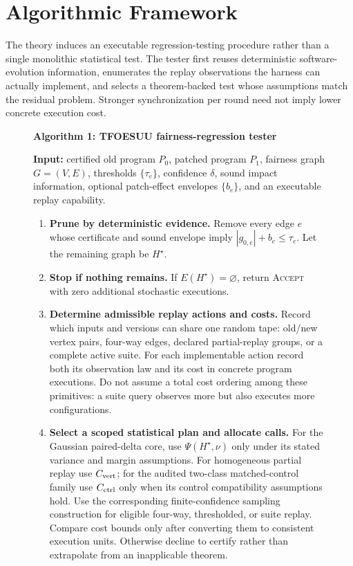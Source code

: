 \section{Algorithmic Framework}
\label{sec:algorithm}

The theory induces an executable regression-testing procedure rather than a
single monolithic statistical test. The tester first reuses deterministic
software-evolution information, enumerates the replay observations the harness
can actually implement, and selects a theorem-backed test whose assumptions
match the residual problem. Stronger synchronization per round need not imply
lower concrete execution cost.

\begin{figure}[t]
\centering
\setlength{\fboxsep}{8pt}
\colorbox{black!5}{\begin{minipage}{0.93\textwidth}
\textbf{Algorithm 1: TFOESUU fairness-regression tester}

\smallskip
\textbf{Input:} certified old program $P_0$, patched program $P_1$, fairness
graph $G=(V,E)$, thresholds $\{\tau_e\}$, confidence $\delta$, sound impact
information, optional patch-effect envelopes $\{b_e\}$, and an executable
replay capability.

\begin{enumerate}[leftmargin=1.6em,itemsep=2pt,topsep=3pt]
\item \textbf{Prune by deterministic evidence.}
Remove every edge $e$ whose certificate and sound envelope imply
$|g_{0,e}|+b_e\le \tau_e$.  Let the remaining graph be $H^\star$.

\item \textbf{Stop if nothing remains.}
If $E(H^\star)=\varnothing$, return \textsc{Accept} with zero additional
stochastic executions.

\item \textbf{Determine admissible replay actions and costs.}
Record which inputs and versions can share one random tape: old/new vertex
pairs, four-way edges, declared partial-replay groups, or a complete active
suite. For each implementable action record both its observation law and
its cost in concrete program executions. Do not assume a total cost ordering
among these primitives: a suite query observes more but also executes more
configurations.

\item \textbf{Select a scoped statistical plan and allocate calls.}
For the Gaussian paired-delta core, use $\Psi(H^\star,\nu)$ only under its
stated variance and margin assumptions. For homogeneous partial replay use
$C_{\rm vert}$; for the audited two-class matched-control family use
$C_{\rm ctrl}$ only when its control compatibility assumptions hold.
Use the corresponding finite-confidence sampling construction for eligible
four-way, thresholded, or suite replay. Compare cost bounds only after
converting them to consistent execution units. Otherwise decline to
certify rather than extrapolate from an inapplicable theorem.


\end{enumerate}
\end{minipage}}
\end{figure}
